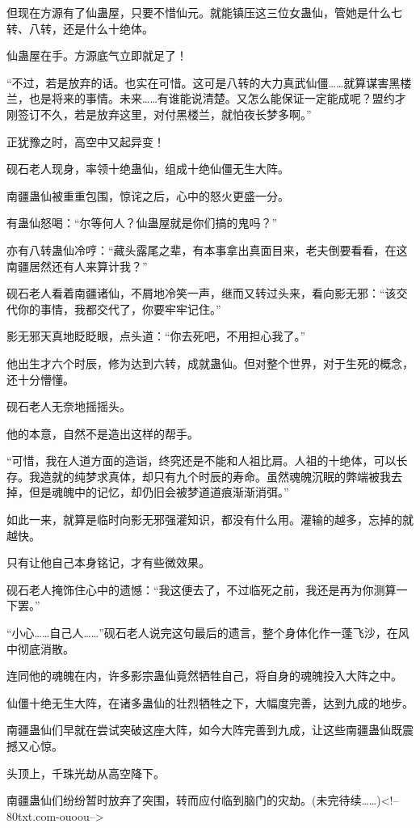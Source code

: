\begin{this_body}
但现在方源有了仙蛊屋，只要不惜仙元。就能镇压这三位女蛊仙，管她是什么七转、八转，还是什么十绝体。

仙蛊屋在手。方源底气立即就足了！

“不过，若是放弃的话。也实在可惜。这可是八转的大力真武仙僵……就算谋害黑楼兰，也是将来的事情。未来……有谁能说清楚。又怎么能保证一定能成呢？盟约才刚签订不久，若是放弃这里，对付黑楼兰，就怕夜长梦多啊。”

正犹豫之时，高空中又起异变！

砚石老人现身，率领十绝蛊仙，组成十绝仙僵无生大阵。

南疆蛊仙被重重包围，惊诧之后，心中的怒火更盛一分。

有蛊仙怒喝：“尔等何人？仙蛊屋就是你们搞的鬼吗？”

亦有八转蛊仙冷哼：“藏头露尾之辈，有本事拿出真面目来，老夫倒要看看，在这南疆居然还有人来算计我？”

砚石老人看着南疆诸仙，不屑地冷笑一声，继而又转过头来，看向影无邪：“该交代你的事情，我都交代了，你要牢牢记住。”

影无邪天真地眨眨眼，点头道：“你去死吧，不用担心我了。”

他出生才六个时辰，修为达到六转，成就蛊仙。但对整个世界，对于生死的概念，还十分懵懂。

砚石老人无奈地摇摇头。

他的本意，自然不是造出这样的帮手。

“可惜，我在人道方面的造诣，终究还是不能和人祖比肩。人祖的十绝体，可以长存。我造就的纯梦求真体，却只有九个时辰的寿命。虽然魂魄沉眠的弊端被我去掉，但是魂魄中的记忆，却仍旧会被梦道道痕渐渐消弭。”

如此一来，就算是临时向影无邪强灌知识，都没有什么用。灌输的越多，忘掉的就越快。

只有让他自己本身铭记，才有些微效果。

砚石老人掩饰住心中的遗憾：“我这便去了，不过临死之前，我还是再为你测算一下罢。”

“小心……自己人……”砚石老人说完这句最后的遗言，整个身体化作一蓬飞沙，在风中彻底消散。

连同他的魂魄在内，许多影宗蛊仙竟然牺牲自己，将自身的魂魄投入大阵之中。

仙僵十绝无生大阵，在诸多蛊仙的壮烈牺牲之下，大幅度完善，达到九成的地步。

南疆蛊仙们早就在尝试突破这座大阵，如今大阵完善到九成，让这些南疆蛊仙既震撼又心惊。

头顶上，千珠光劫从高空降下。

南疆蛊仙们纷纷暂时放弃了突围，转而应付临到脑门的灾劫。(未完待续……)<!--80txt.com-ouoou-->

\end{this_body}


